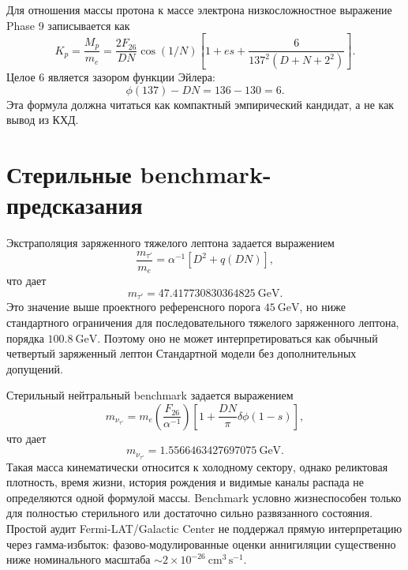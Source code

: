 \documentclass[11pt]{article}
\begin{document}
Для отношения массы протона к массе электрона низкосложностное выражение Phase
9 записывается как
\begin{equation}
    K_p=\frac{M_p}{m_e}
    =
    \frac{2F_{26}}{DN}\cos(1/N)
    \left[
        1+es+\frac{6}{137^2(D+N+2^2)}
    \right].
\end{equation}
Целое $6$ является зазором функции Эйлера:
\begin{equation}
    \phi(137)-DN=136-130=6.
\end{equation}
Эта формула должна читаться как компактный эмпирический кандидат, а не как
вывод из КХД.

\section{Стерильные benchmark-предсказания}

Экстраполяция заряженного тяжелого лептона задается выражением
\begin{equation}
    \frac{m_{\tau'}}{m_e}
    =
    \alpha^{-1}\left[D^2+q(DN)\right],
\end{equation}
что дает
\begin{equation}
    m_{\tau'}=47.417730830364825~\mathrm{GeV}.
\end{equation}
Это значение выше проектного референсного порога $45~\mathrm{GeV}$, но ниже
стандартного ограничения для последовательного тяжелого заряженного лептона,
порядка $100.8~\mathrm{GeV}$. Поэтому оно не может интерпретироваться как
обычный четвертый заряженный лептон Стандартной модели без дополнительных
допущений.

Стерильный нейтральный benchmark задается выражением
\begin{equation}
    m_{\nu_{\tau'}}
    =
    m_e
    \left(\frac{F_{26}}{\alpha^{-1}}\right)
    \left[
        1+\frac{DN}{\pi}\delta\phi(1-s)
    \right],
\end{equation}
что дает
\begin{equation}
    m_{\nu_{\tau'}}=1.5566463427697075~\mathrm{GeV}.
\end{equation}
Такая масса кинематически относится к холодному сектору, однако реликтовая
плотность, время жизни, история рождения и видимые каналы распада не
определяются одной формулой массы. Benchmark условно жизнеспособен только для
полностью стерильного или достаточно сильно развязанного состояния. Простой
аудит Fermi-LAT/Galactic Center не поддержал прямую интерпретацию через
гамма-избыток: фазово-модулированные оценки аннигиляции существенно ниже
номинального масштаба $\sim2\times10^{-26}~\mathrm{cm^3\,s^{-1}}$.
\end{document}
